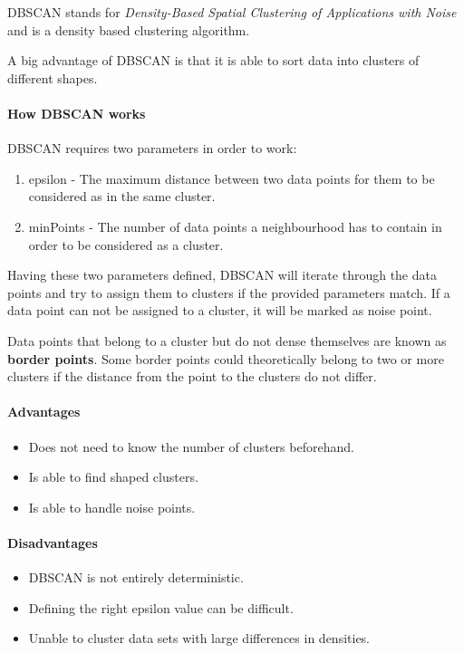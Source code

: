 DBSCAN stands for \textit{Density-Based Spatial Clustering of Applications with Noise}
and is a density based clustering algorithm.

A big advantage of DBSCAN is that it is able to sort data into clusters
of different shapes.

\paragraph{How DBSCAN works}
DBSCAN requires two parameters in order to work:

\begin{enumerate}
    \item epsilon - The maximum distance between two data points for them to be considered as in the same cluster.
    \item minPoints - The number of data points a neighbourhood has to contain in order to be considered as a cluster.
\end{enumerate}

Having these two parameters defined, DBSCAN will iterate through the data points
and try to assign them to clusters if the provided parameters match.
If a data point can not be assigned to a cluster, it will be marked as noise point.

Data points that belong to a cluster but do not dense themselves are known as \textbf{border points}.
Some border points could theoretically belong to two or more clusters
if the distance from the point to the clusters do not differ.

\paragraph{Advantages}
\begin{itemize}
    \item Does not need to know the number of clusters beforehand.
    \item Is able to find shaped clusters.
    \item Is able to handle noise points.
\end{itemize}

\paragraph{Disadvantages}
\begin{itemize}
    \item DBSCAN is not entirely deterministic.
    \item Defining the right epsilon value can be difficult.
    \item Unable to cluster data sets with large differences in densities.
\end{itemize}

